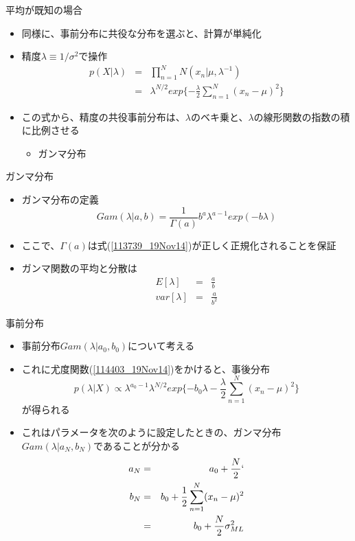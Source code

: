 \begin{frame}{平均が既知の場合}
 \begin{itemize}
  \item 同様に、事前分布に共役な分布を選ぶと、計算が単純化
  \item 精度$\lambda\equiv 1/\sigma^2$で操作
        \begin{eqnarray}
         p(X|\lambda) &=& \prod_{n=1}^{N}N(x_n|\mu,\lambda^{-1}) \nonumber \\
          &=& \lambda^{N/2}exp\{-\frac{\lambda}{2}\sum_{n=1}^{N}(x_n-\mu)^2\}\label{114403_19Nov14}
        \end{eqnarray}
  \item この式から、精度の共役事前分布は、$\lambda$のベキ乗と、$\lambda$の線形関数の指数の積に比例させる
        \begin{itemize}
         \item ガンマ分布
        \end{itemize}
 \end{itemize}
\end{frame}


\begin{frame}{ガンマ分布}
\begin{itemize}
 \item ガンマ分布の定義
			 \begin{equation}
				Gam(\lambda|a,b) = \frac{1}{\Gamma(a)}b^a\lambda^{a-1}exp(-b\lambda)\label{113739_19Nov14}
			 \end{equation}
 \item ここで、$\Gamma(a)$は式(\ref{113739_19Nov14})が正しく正規化されることを保証
 \item ガンマ関数の平均と分散は
			 \begin{eqnarray}
				E[\lambda] &=& \frac{a}{b}\\
				var[\lambda]& =& \frac{a}{b^2}
			 \end{eqnarray}
\end{itemize}
\end{frame}

\begin{frame}{事前分布}
 \begin{itemize}
	\item 事前分布$Gam(\lambda|a_0,b_0)$について考える
	\item これに尤度関数(\ref{114403_19Nov14})をかけると、事後分布
\begin{equation}
 p(\lambda|X) \propto \lambda^{a_0-1}\lambda^{N/2}exp\{-b_0\lambda-\frac{\lambda}{2}\sum_{n=1}^{N}(x_n-\mu)^2\}\label{114734_19Nov14}
\end{equation}
				が得られる
	\item これはパラメータを次のように設定したときの、ガンマ分布$Gam(\lambda|a_N,b_N)$であることが分かる
				\begin{eqnarray}
				 a_N&=& a_0 + \frac{N}{2}`\label{115004_19Nov14}\\
				 b_N&= & b_0+\frac{1}{2}\sum_{n=1}^{N}(x_n-\mu)^2\\
				 &= & b_0+\frac{N}{2}\sigma^2_{ML}\label{115046_19Nov14}
				\end{eqnarray}
 \end{itemize}
\end{frame}

